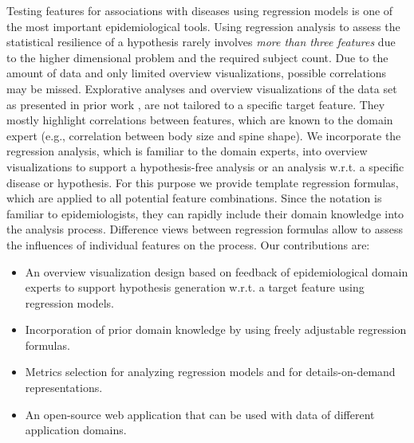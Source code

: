 \documentclass[journal]{style/vgtc} 			          %
\begin{document}
Testing features for associations with diseases using regression models is one of the most important epidemiological tools.
Using regression analysis to assess the statistical resilience of a hypothesis rarely involves \emph{more than three features} due to the higher dimensional problem and the required subject count.
Due to the amount of data and only limited overview visualizations, possible correlations may be missed.
Explorative analyses and overview visualizations of the data set as presented in prior work \cite{Klemm2014VIS}, are not tailored to a specific target feature.
They mostly highlight correlations between features, which are known to the domain expert (e.g., correlation between body size and spine shape).
We incorporate the regression analysis, which is familiar to the domain experts, into overview visualizations to support a hypothesis-free analysis or an analysis w.r.t. a specific disease or hypothesis.
For this purpose we provide template regression formulas, which are applied to all potential feature combinations.
Since the notation is familiar to epidemiologists, they can rapidly include their domain knowledge into the analysis process.
Difference views between regression formulas allow to assess the influences of individual features on the process.
Our contributions are:
\begin{itemize}
  \item An overview visualization design based on feedback of epidemiological domain experts to support hypothesis generation w.r.t. a target feature using regression models.
	\item Incorporation of prior domain knowledge by using freely adjustable regression formulas.
	\item Metrics selection for analyzing regression models and for details-on-demand representations.
	\item An open-source web application that can be used with data of different application domains.
\end{itemize}
\end{document}
